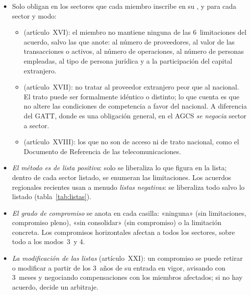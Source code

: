 \documentclass[11pt]{article}
\begin{document}
\begin{itemize}
\item Solo obligan en los sectores que cada miembro inscribe en su , y para cada sector y modo:
  \begin{itemize}
  \item {} (artículo~XVI): el miembro no mantiene ninguna de las 6~limitaciones del acuerdo, salvo las que anote: al número de proveedores, al valor de las transacciones o activos, al número de operaciones, al número de personas empleadas, al tipo de persona jurídica y a la participación del capital extranjero.
  \item {} (artículo~XVII): no tratar al proveedor extranjero peor que al nacional. El trato puede ser formalmente idéntico o distinto; lo que cuenta es que no altere las condiciones de competencia a favor del nacional. A diferencia del GATT, donde es una obligación general, en el AGCS \emph{se negocia} sector a sector.
  \item {} (artículo~XVIII): los que no son de acceso ni de trato nacional, como el Documento de Referencia de las telecomunicaciones.
  \end{itemize}
\item \emph{El método es de lista positiva}: solo se liberaliza lo que figura en la lista; dentro de cada sector listado, se enumeran las limitaciones. Los acuerdos regionales recientes usan a menudo \emph{listas negativas}: se liberaliza todo salvo lo listado (tabla~\ref{tab:listas}).
\item \emph{El grado de compromiso} se anota en cada casilla: «ninguna» (sin limitaciones, compromiso pleno), «sin consolidar» (sin compromiso) o la limitación concreta. Los compromisos horizontales afectan a todos los sectores, sobre todo a los modos~3~y 4.
\item \emph{La modificación de las listas} (artículo~XXI): un compromiso se puede retirar o modificar a partir de los 3~años de su entrada en vigor, avisando con 3~meses y negociando compensaciones con los miembros afectados; si no hay acuerdo, decide un arbitraje.
\end{itemize}
\end{document}
